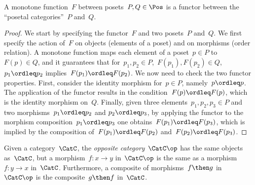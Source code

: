 \begin{lemma}
\label{lemma:posetfunctor}
A monotone function~$F$ between posets~$P,Q \in \Pos$ is a functor between the ``posetal categories''~$P$ and~$Q$.
\end{lemma}
\begin{proof}
We start by specifying the functor~$F$ and two posets~$P$ and~$Q$. We first specify the action of~$F$ on objects (elements of a poset) and on morphisms (order relation). A monotone function maps each element of a poset~$p\in P$ to~$F(p) \in Q$, and it guarantees that for~$p_1,p_2\in P$,~$F(p_1),F(p_2)\in Q$,~$p_1\ordleq p_2$ implies~$F(p_1)\ordleq F(p_2)$. We now need to check the two functor properties. First, consider the identity morphism for~$p\in P$, namely~$p\ordleq p$. The application of the functor results in the condition~$F(p)\ordleq F(p)$, which is the identity morphism on~$Q$. Finally, given three elements~$p_1,p_2,p_3\in P$ and two morphisms~$p_1\ordleq p_2$ and $p_2\ordleq p_3$, by applying the functor to the morphism composition~$p_1\ordleq p_3$ one obtains~$F(p_1)\ordleq F(p_3)$, which is implied by the composition of~$F(p_1)\ordleq F(p_2)$ and~$F(p_2)\ordleq F(p_3)$.
\end{proof}

\begin{shaded}
\begin{definition}
\label{def:oppositecat}
Given a category~$\CatC$, the \emph{opposite category}~$\CatC\op$ has the same objects as~$\CatC$, but a morphism~$f\colon x\to y$ in~$\CatC\op$ is the same as a morphism~$f\colon y\to x$ in~$\CatC$. Furthermore, a composite of morphisms~$f\then g$ in~$\CatC\op$ is the composite~$g\then f$ in~$\CatC$.
\end{definition}
\end{shaded}

